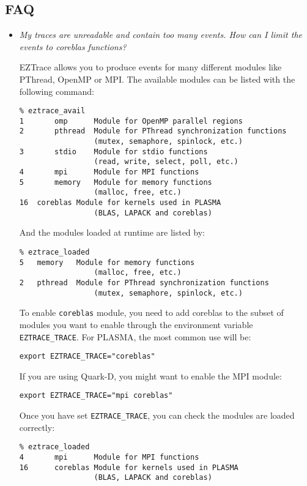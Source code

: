 \subsection{FAQ}
\begin{itemize}
\item \textit{My traces are unreadable and contain too many events. How can I
  limit the events to coreblas functions?}\newline

  EZTrace allows you to produce events for many different modules
  like PThread, OpenMP or MPI. The available modules can be listed
  with the following command:
\begin{verbatim}
% eztrace_avail
1       omp      Module for OpenMP parallel regions
2       pthread  Module for PThread synchronization functions
                 (mutex, semaphore, spinlock, etc.)
3       stdio    Module for stdio functions
                 (read, write, select, poll, etc.)
4       mpi      Module for MPI functions
5       memory   Module for memory functions
                 (malloc, free, etc.)
16	coreblas Module for kernels used in PLASMA
                 (BLAS, LAPACK and coreblas)
\end{verbatim}

And the modules loaded at runtime are listed by:
\begin{verbatim}
% eztrace_loaded
5	memory   Module for memory functions
                 (malloc, free, etc.)
2	pthread  Module for PThread synchronization functions
                 (mutex, semaphore, spinlock, etc.)
\end{verbatim}

To enable \texttt{coreblas} module, you need to add coreblas to the
subset of modules you want to enable through the environment variable
\texttt{EZTRACE\_TRACE}.
For PLASMA, the most common use will be:
\begin{verbatim}
export EZTRACE_TRACE="coreblas"
\end{verbatim}
If you are using Quark-D, you might want to enable the MPI module:
\begin{verbatim}
export EZTRACE_TRACE="mpi coreblas"
\end{verbatim}

Once you have set \texttt{EZTRACE\_TRACE}, you can check the modules
are loaded correctly:

\begin{verbatim}
% eztrace_loaded
4       mpi      Module for MPI functions
16      coreblas Module for kernels used in PLASMA
                 (BLAS, LAPACK and coreblas)
\end{verbatim}


\end{itemize}
